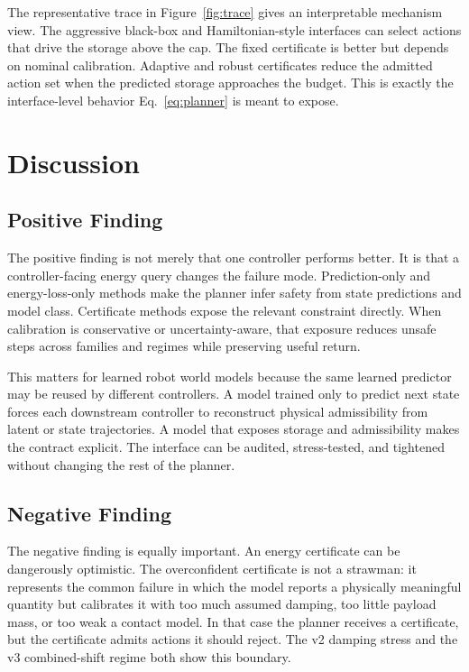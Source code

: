 \documentclass{article}
\begin{document}
The representative trace in Figure~\ref{fig:trace} gives an interpretable mechanism view. The aggressive black-box and Hamiltonian-style interfaces can select actions that drive the storage above the cap. The fixed certificate is better but depends on nominal calibration. Adaptive and robust certificates reduce the admitted action set when the predicted storage approaches the budget. This is exactly the interface-level behavior Eq.~\ref{eq:planner} is meant to expose.

\section{Discussion}

\subsection{Positive Finding}

The positive finding is not merely that one controller performs better. It is that a controller-facing energy query changes the failure mode. Prediction-only and energy-loss-only methods make the planner infer safety from state predictions and model class. Certificate methods expose the relevant constraint directly. When calibration is conservative or uncertainty-aware, that exposure reduces unsafe steps across families and regimes while preserving useful return.

This matters for learned robot world models because the same learned predictor may be reused by different controllers. A model trained only to predict next state forces each downstream controller to reconstruct physical admissibility from latent or state trajectories. A model that exposes storage and admissibility makes the contract explicit. The interface can be audited, stress-tested, and tightened without changing the rest of the planner.

\subsection{Negative Finding}

The negative finding is equally important. An energy certificate can be dangerously optimistic. The overconfident certificate is not a strawman: it represents the common failure in which the model reports a physically meaningful quantity but calibrates it with too much assumed damping, too little payload mass, or too weak a contact model. In that case the planner receives a certificate, but the certificate admits actions it should reject. The v2 damping stress and the v3 combined-shift regime both show this boundary.
\end{document}
